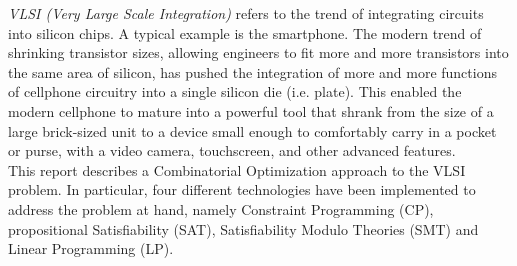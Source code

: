 \textit{VLSI (Very Large Scale Integration)} refers to the trend of integrating circuits into 
silicon chips. A typical example is the smartphone. The modern trend of shrinking transistor sizes,
allowing engineers to fit more and more transistors into the same area of silicon, has pushed the 
integration of more and more functions of cellphone circuitry into a single silicon die (i.e. 
plate). This enabled the modern cellphone to mature into a powerful tool that shrank from the size 
of a large brick-sized unit to a device small enough to comfortably carry in a pocket or purse, 
with a video camera, touchscreen, and other advanced features. \\

This report describes a Combinatorial Optimization approach to the VLSI problem. In particular, 
four different technologies have been implemented to address the problem at hand, namely Constraint 
Programming (CP), propositional Satisfiability (SAT), Satisfiability Modulo Theories (SMT) and 
Linear Programming (LP).